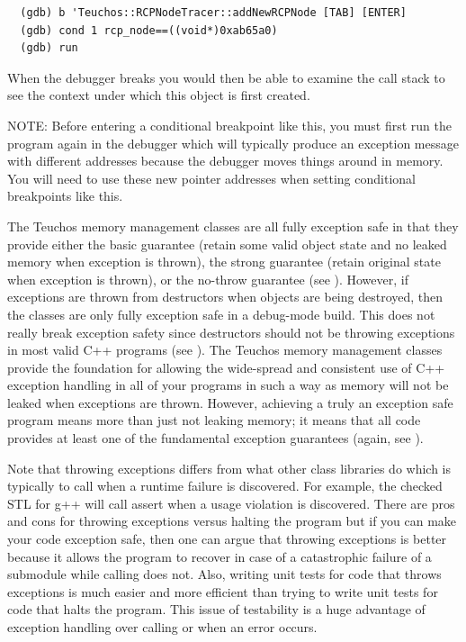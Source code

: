 \documentclass[pdf,ps2pdf,11pt]{SANDreport}
\begin{document}
{\small\begin{verbatim}
  (gdb) b 'Teuchos::RCPNodeTracer::addNewRCPNode [TAB] [ENTER]
  (gdb) cond 1 rcp_node==((void*)0xab65a0)
  (gdb) run
\end{verbatim}}

When the debugger breaks you would then be able to examine the call
stack to see the context under which this {} object is
first created.

NOTE: Before entering a conditional breakpoint like this, you must
first run the program again in the debugger which will typically
produce an exception message with different addresses because the
debugger moves things around in memory.  You will need to use these
new pointer addresses when setting conditional breakpoints like this.

The Teuchos memory management classes are all fully exception safe in
that they provide either the basic guarantee (retain some valid object
state and no leaked memory when exception is thrown), the strong
guarantee (retain original state when exception is thrown), or the
no-throw guarantee (see {}\cite[Item 71]{C++CodingStandards05}).
However, if exceptions are thrown from destructors when objects are
being destroyed, then the classes are only fully exception safe in a
debug-mode build.  This does not really break exception safety since
destructors should not be throwing exceptions in most valid C++
programs (see {}\cite[Item 51]{C++CodingStandards05}).  The Teuchos
memory management classes provide the foundation for allowing the
wide-spread and consistent use of C++ exception handling in all of
your programs in such a way as memory will not be leaked when
exceptions are thrown.  However, achieving a truly an exception safe
program means more than just not leaking memory; it means that all
code provides at least one of the fundamental exception guarantees
(again, see {}\cite[Item 71]{C++CodingStandards05}).

Note that throwing exceptions differs from what other class libraries
do which is typically to call {} when a runtime
failure is discovered.  For example, the checked STL for g++ will call
assert when a usage violation is discovered.  There are pros and cons
for throwing exceptions versus halting the program but if you can make
your code exception safe, then one can argue that throwing exceptions
is better because it allows the program to recover in case of a
catastrophic failure of a submodule while calling
{} does not.  Also, writing unit tests for code
that throws exceptions is much easier and more efficient than trying
to write unit tests for code that halts the program.  This issue of
testability is a huge advantage of exception handling over calling
{} or {} when an error occurs.
\end{document}
